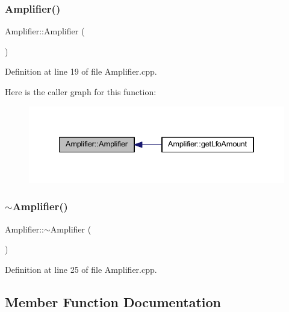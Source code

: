 \subsubsection{\texorpdfstring{Amplifier()}{Amplifier()}}
{\footnotesize\ttfamily Amplifier\+::\+Amplifier (\begin{DoxyParamCaption}{ }\end{DoxyParamCaption})}



Definition at line 19 of file Amplifier.\+cpp.

Here is the caller graph for this function\+:
\nopagebreak
\begin{figure}[H]
\begin{center}
\leavevmode
\includegraphics[width=334pt]{class_amplifier_ad89ce9e2bd6877057d15266d0d3feb4e_icgraph}
\end{center}
\end{figure}
\mbox{\label{class_amplifier_a6cb2421d049843d6b1994364ea29aabd}} 
\subsubsection{\texorpdfstring{$\sim$\+Amplifier()}{~Amplifier()}}
{\footnotesize\ttfamily Amplifier\+::$\sim$\+Amplifier (\begin{DoxyParamCaption}{ }\end{DoxyParamCaption})}



Definition at line 25 of file Amplifier.\+cpp.



\subsection{Member Function Documentation}
\mbox{\label{class_amplifier_a4cb59ec35a428bf0361799326fbb42c3}} 
